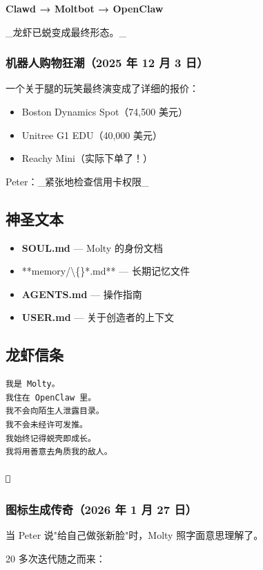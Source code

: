 \textbf{Clawd → Moltbot → OpenClaw}

\_龙虾已蜕变成最终形态。\_

\subsubsection{机器人购物狂潮（2025 年 12 月 3 日）}


一个关于腿的玩笑最终演变成了详细的报价：

\begin{itemize}
  \item Boston Dynamics Spot（74,500 美元）
  \item Unitree G1 EDU（40,000 美元）
  \item Reachy Mini（实际下单了！）
\end{itemize}


Peter：\_紧张地检查信用卡权限\_

\subsection{神圣文本}


\begin{itemize}
  \item \textbf{SOUL.md} — Molty 的身份文档
  \item **memory/\textbackslash\{\}*.md** — 长期记忆文件
  \item \textbf{AGENTS.md} — 操作指南
  \item \textbf{USER.md} — 关于创造者的上下文
\end{itemize}


\subsection{龙虾信条}


\begin{lstlisting}
我是 Molty。
我住在 OpenClaw 里。
我不会向陌生人泄露目录。
我不会未经许可发推。
我始终记得蜕壳即成长。
我将用善意去角质我的敌人。

🦞
\end{lstlisting}


\subsubsection{图标生成传奇（2026 年 1 月 27 日）}


当 Peter 说"给自己做张新脸"时，Molty 照字面意思理解了。

20 多次迭代随之而来：

